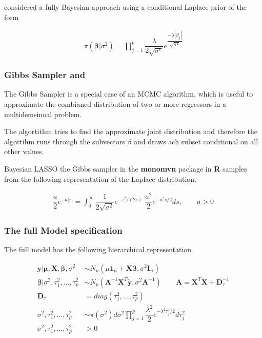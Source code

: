\documentclass[12pt,a4paper]{article}
\begin{document}
\textcite{park_bayesian_2008} considered a fully Bayesian approach using
a conditional Laplace prior of the form

\begin{align} 
\label{eq:la_bay_prior}
 \pi \left( \pmb{\beta} | \sigma^2 \right)   = \prod_{j = 1}^{p} \dfrac{\lambda}{2 \sqrt{\sigma^e}} e^{\dfrac{- \lambda |\beta_j |}{\sqrt{\sigma^2}}} 
\end{align}

\autocite{park_bayesian_2008}

\hypertarget{gibbs-sampler-and}{%
\subsubsection{Gibbs Sampler and}\label{gibbs-sampler-and}}

The Gibbs Sampler is a special case of an \ac{MCMC} algorithm, which is
useful to approximate the combianed distribution of two or more
regressors in a multidemsinoal problem.

The algortithm tries to find the approximate joint distribution and
therefore the algortihm runs through the subvectors \(\beta\) and draws
ach subset conditional on all other values.
\autocite{gelman_bayesian_2004}

Bayesian \ac{LASSO} the Gibbs sampler in the \textbf{monomvn} package in
\textbf{R} \autocite{gramacy_monomvn_2019} samples from the following
representation of the Laplace distribution.
\textcite{andrews_scale_1974}

\begin{align} 
\label{eq:gibbs}
  \dfrac{a}{2}e^{-a |z|} = \int_{0}^{\infty} \dfrac{1}{2 \sqrt{\sigma^2}} e^{ -z^2 / (2s)} \; \dfrac{a^2}{2} e^{ -a^2 s /2} ds, \qquad a > 0 
\end{align}

\hypertarget{the-full-model-specification}{%
\subsubsection{The full Model
specification}\label{the-full-model-specification}}

The full model has the following hierarchical representation

\begin{align*}
  \pmb{y|\mu}, \pmb{X}, \pmb{\beta}, \sigma^2 & \sim N_n (\mu \pmb{1}_n + \pmb{X \beta}, \sigma^2  \pmb{I}_n)   \nonumber\\
  \pmb{\beta} | \sigma^2, \tau^2_1 , \ldots , \tau^2_p & \sim N_p (\pmb{A}^{-1} \pmb{X}^T \tilde{\pmb{y}}  , \sigma^2 \pmb{A}^{-1}) \qquad \pmb{A} = \pmb{X}^T \pmb{X} + \pmb{D}^{-1}_{\tau} \nonumber \\
  \pmb{D}_{\tau} & = diag(\tau^2_1 , \ldots , \tau^2_p) \nonumber \\ 
  \sigma^2, \tau^2_1 , \ldots , \tau^2_p & \sim \pi \left( \sigma^2 \right) d \sigma^2 \prod_{j = 1}^{p} \dfrac{\lambda^2}{2}e^{- \lambda^2 \tau^2_j /2} d \tau^2_j \nonumber \\
  \sigma^2, \tau^2_1 , \ldots , \tau^2_p & > 0 \nonumber \\
\end{align*}
\end{document}

